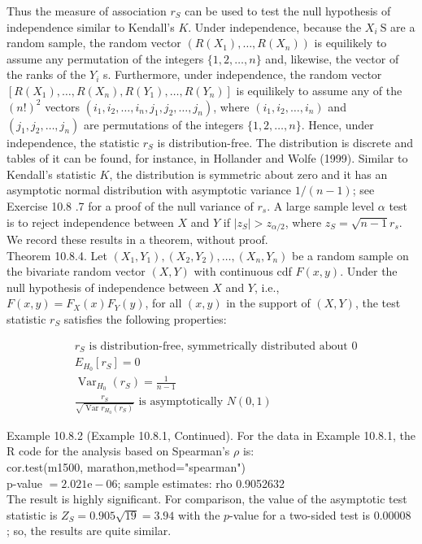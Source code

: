 Thus the measure of association $r_{S}$ can be used to test the null hypothesis of independence similar to Kendall's $K$. Under independence, because the $X_{i} \mathrm{~S}$ are a random sample, the random vector $\left(R\left(X_{1}\right), \ldots, R\left(X_{n}\right)\right)$ is equilikely to assume any permutation of the integers $\{1,2, \ldots, n\}$ and, likewise, the vector of the ranks of the $Y_{i}$ s. Furthermore, under independence, the random vector $\left[R\left(X_{1}\right), \ldots, R\left(X_{n}\right), R\left(Y_{1}\right), \ldots, R\left(Y_{n}\right)\right]$ is equilikely to assume any of the $(n!)^{2}$ vectors $\left(i_{1}, i_{2}, \ldots, i_{n}, j_{1}, j_{2}, \ldots, j_{n}\right)$, where $\left(i_{1}, i_{2}, \ldots, i_{n}\right)$ and $\left(j_{1}, j_{2}, \ldots, j_{n}\right)$ are permutations of the integers $\{1,2, \ldots, n\}$. Hence, under independence, the statistic $r_{S}$ is distribution-free. The distribution is discrete and tables of it can be found, for instance, in Hollander and Wolfe (1999). Similar to Kendall's statistic $K$, the distribution is symmetric about zero and it has an asymptotic normal distribution with asymptotic variance $1 /(n-1)$; see Exercise 10.8 .7 for a proof of the null variance of $r_{s}$. A large sample level $\alpha$ test is to reject independence between $X$ and $Y$ if $\left|z_{S}\right|>z_{\alpha / 2}$, where $z_{S}=\sqrt{n-1} r_{s}$. We record these results in a theorem, without proof.\\
Theorem 10.8.4. Let $\left(X_{1}, Y_{1}\right),\left(X_{2}, Y_{2}\right), \ldots,\left(X_{n}, Y_{n}\right)$ be a random sample on the bivariate random vector $(X, Y)$ with continuous cdf $F(x, y)$. Under the null hypothesis of independence between $X$ and $Y$, i.e., $F(x, y)=F_{X}(x) F_{Y}(y)$, for all $(x, y)$ in the support of $(X, Y)$, the test statistic $r_{S}$ satisfies the following properties:


\begin{align*}
& r_{S} \text { is distribution-free, symmetrically distributed about } 0  \tag{10.8.11}\\
& E_{H_{0}}\left[r_{S}\right]=0  \tag{10.8.12}\\
& \operatorname{Var}_{H_{0}}\left(r_{S}\right)=\frac{1}{n-1}  \tag{10.8.13}\\
& \frac{r_{S}}{\sqrt{\operatorname{Var} r_{H_{0}}\left(r_{S}\right)}} \text { is asymptotically } N(0,1) \tag{10.8.14}
\end{align*}


Example 10.8.2 (Example 10.8.1, Continued). For the data in Example 10.8.1, the R code for the analysis based on Spearman's $\rho$ is:\\
cor.test(m1500, marathon,method="spearman")\\
p-value $=2.021 \mathrm{e}-06$; sample estimates: rho 0.9052632\\
The result is highly significant. For comparison, the value of the asymptotic test statistic is $Z_{S}=0.905 \sqrt{19}=3.94$ with the $p$-value for a two-sided test is 0.00008 ; so, the results are quite similar.


